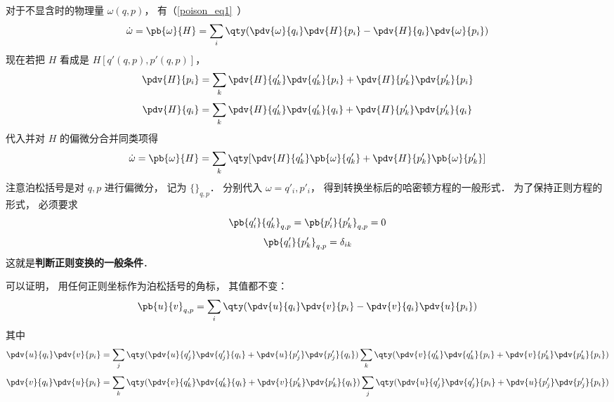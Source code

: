 对于不显含时的物理量 $\omega(q, p)$， 有（\autoref{poison_eq1}~）
\begin{equation}
\dot \omega  = \pb{\omega}{H}  = \sum_i \qty(\pdv{\omega}{q_i}\pdv{H}{p_i} - \pdv{H}{q_i} \pdv{\omega}{p_i})
\end{equation}
现在若把 $H$ 看成是 $H[q'(q,p),p'(q,p)]$，  
\begin{equation}
\pdv{H}{p_i} = \sum_k \pdv{H}{q'_k} \pdv{q'_k}{p_i} + \pdv{H}{p'_k} \pdv{p'_k}{p_i}
\end{equation}
\begin{equation}
\pdv{H}{q_i} = \sum_k \pdv{H}{q'_k} \pdv{q'_k}{q_i} + \pdv{H}{p'_k} \pdv{p'_k}{q_i}
\end{equation}
代入并对 $H$ 的偏微分合并同类项得
\begin{equation}
\dot \omega  = \pb{\omega}{H} = \sum_k \qty[ \pdv{H}{q'_k} \pb{\omega}{q'_k} + \pdv{H}{p'_k} \pb{\omega}{p'_k}]
\end{equation}
注意泊松括号是对 $q,p$ 进行偏微分， 记为 $\{ {}\}_{q,p}$．  分别代入 $\omega  = q'_i, p'_i$，  得到转换坐标后的哈密顿方程的一般形式． 为了保持正则方程的形式， 必须要求
\begin{equation}
\pb{q'_i}{q'_k}_{q,p} = \pb{p'_i}{p'_k}_{q,p} = 0
\end{equation}
\begin{equation}\label{ClsMec_eq2}
\pb{q'_i}{p'_k}_{q,p} = \delta_{ik}
\end{equation}
这就是\textbf{判断正则变换的一般条件}．

可以证明， 用任何正则坐标作为泊松括号的角标， 其值都不变：
\begin{equation}\label{ClsMec_eq1}
\pb{u}{v}_{q,p} = \sum_i \qty( \pdv{u}{q_i}\pdv{v}{p_i} - \pdv{v}{q_i}\pdv{u}{p_i} ) 
\end{equation}
其中
\begin{equation}
\pdv{u}{q_i} \pdv{v}{p_i} = \sum_j \qty( \pdv{u}{q'_j} \pdv{q'_j}{q_i} + \pdv{u}{p'_j}\pdv{p'_j}{q_i} ) \sum_k \qty(\pdv{v}{q'_k}\pdv{q'_k}{p_i} + \pdv{v}{p'_k}\pdv{p'_k}{p_i}) 
\end{equation}
\begin{equation}
\pdv{v}{q_i} \pdv{u}{p_i} = \sum_k \qty( \pdv{v}{q'_k}\pdv{q'_k}{q_i} + \pdv{v}{p'_k}\pdv{p'_k}{q_i} ) \sum_j \qty(\pdv{u}{q'_j}\pdv{q'_j}{p_i} + \pdv{u}{p'_j}\pdv{p'_j}{p_i})
\end{equation}
 
